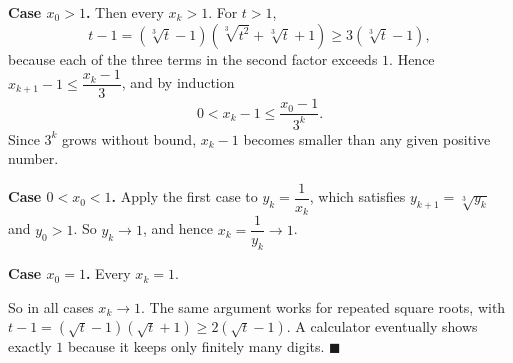 \textbf{Case $x_0>1$.} Then every $x_k>1$. For $t>1$,
\[t-1=\left(\sqrt[3]t-1\right)\left(\sqrt[3]{t^2}+\sqrt[3]t+1\right)\ge3\left(\sqrt[3]t-1\right),\]
because each of the three terms in the second factor exceeds $1$. Hence $x_{k+1}-1\le\dfrac{x_k-1}{3}$, and by induction
\[0<x_k-1\le\dfrac{x_0-1}{3^k}.\]
Since $3^k$ grows without bound, $x_k-1$ becomes smaller than any given positive number.

\textbf{Case $0<x_0<1$.} Apply the first case to $y_k=\dfrac{1}{x_k}$, which satisfies $y_{k+1}=\sqrt[3]{y_k}$ and $y_0>1$. So $y_k\to1$, and hence $x_k=\dfrac{1}{y_k}\to1$.

\textbf{Case $x_0=1$.} Every $x_k=1$.

So in all cases $x_k\to1$. The same argument works for repeated square roots, with $t-1=(\sqrt t-1)(\sqrt t+1)\ge2(\sqrt t-1)$. A calculator eventually shows exactly $1$ because it keeps only finitely many digits. $\blacksquare$
